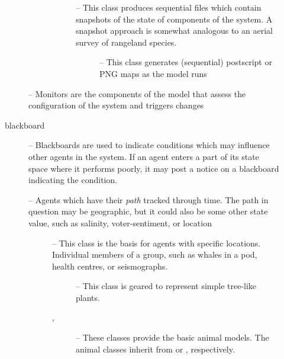 \begin{description}
\begin{description}
\begin{description}
\begin{description}
      \item[] -- This class produces sequential files
        which contain snapshots of the state of components of the
        system.  A snapshot approach is somewhat analogous to an
        aerial survey of rangeland species.
        
        \begin{description}
        \item[] -- This class generates (sequential)
          postscript or PNG maps as the model runs
        \end{description}
      \end{description}
    \end{description}

  \item[\TTC{monitor}] -- Monitors are the components of the
    model that assess the configuration of the system and
    triggers changes

  \item[blackboard] -- Blackboards are used to indicate
    conditions which may influence other agents in the system.
    If an agent enters a part of its state space where it
    performs poorly, it may post a notice on a blackboard
    indicating the condition.

  \item[\TTC{tracked-agent}] -- Agents which have their
    \emph{path} tracked through time.  The path in question may
    be geographic, but it could also be some other state
    value, such as salinity, voter-sentiment, or location

    \begin{description}
    \item[] -- This class is the basis for agents with
      specific locations. Individual members of a group, such as
      whales in a pod, health centres, or seismographs.
      
      \begin{description}
      \item[] -- This class is geared to
        represent simple tree-like plants.

      \item[, ] -- These classes
        provide the basic animal models.  The animal classes
        inherit from  or ,
        respectively. 
      \end{description}



\end{description}
\end{description}
\end{description}
